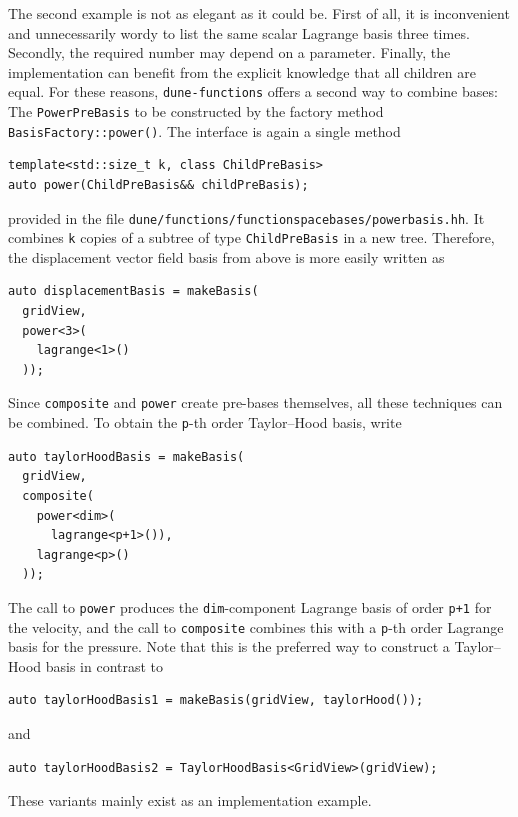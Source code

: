 \documentclass[a4paper,10pt,headings=normal,bibliography=totoc]{scrartcl}
\newcommand{\cpp}[1]{\lstinline[basicstyle=\ttfamily]!#1!}
\newcommand{\dunemodule}[1]{\texttt{#1}}
\newcommand{\file}[1]{\texttt{#1}}
\begin{document}
The second example is not as elegant as it could be.  First of all, it is inconvenient and unnecessarily
wordy to list the same scalar Lagrange basis three times.  Secondly, the required number may depend on
a parameter.
Finally, the implementation can benefit from the explicit knowledge that
all children are equal.
For these reasons, \dunemodule{dune-functions}
offers a second way to combine bases: The \cpp{PowerPreBasis}
to be constructed by the factory method \cpp{BasisFactory::power()}.
The interface is again a single method
\begin{lstlisting}[style=Interface]
template<std::size_t k, class ChildPreBasis>
auto power(ChildPreBasis&& childPreBasis);
\end{lstlisting}
provided in the file \file{dune/functions/functionspacebases/powerbasis.hh}.
It combines \cpp{k} copies of a subtree of type \cpp{ChildPreBasis} in a new tree.  Therefore, the
displacement vector field basis from above is more easily written as
\begin{lstlisting}[style=Example]
auto displacementBasis = makeBasis(
  gridView,
  power<3>(
    lagrange<1>()
  ));
\end{lstlisting}
Since \cpp{composite} and \cpp{power} create pre-bases themselves,
all these techniques can be combined. To obtain the \cpp{p}-th order Taylor--Hood basis,
write
\begin{lstlisting}[style=Example]
auto taylorHoodBasis = makeBasis(
  gridView,
  composite(
    power<dim>(
      lagrange<p+1>()),
    lagrange<p>()
  ));
\end{lstlisting}
The call to \cpp{power} produces the \cpp{dim}-component Lagrange basis of order \cpp{p+1} for the velocity,
and the call to \cpp{composite} combines this with a \cpp{p}-th order Lagrange basis for the pressure.
Note that this is the preferred way to construct a Taylor--Hood basis in contrast to
\begin{lstlisting}[style=Example]
auto taylorHoodBasis1 = makeBasis(gridView, taylorHood());
\end{lstlisting}
and
\begin{lstlisting}[style=Example]
auto taylorHoodBasis2 = TaylorHoodBasis<GridView>(gridView);
\end{lstlisting}
These variants mainly exist as an implementation example.
\end{document}
